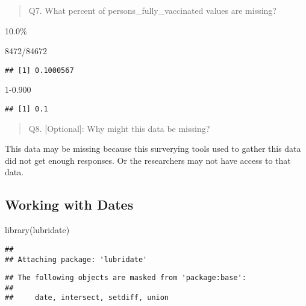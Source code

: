 \documentclass[
]{article}
\newenvironment{Shaded}{\begin{snugshade}}{\end{snugshade}}
\newcommand{\DecValTok}[1]{\textcolor[rgb]{0.00,0.00,0.81}{#1}}
\newcommand{\FloatTok}[1]{\textcolor[rgb]{0.00,0.00,0.81}{#1}}
\newcommand{\FunctionTok}[1]{\textcolor[rgb]{0.00,0.00,0.00}{#1}}
\newcommand{\NormalTok}[1]{#1}
\newcommand{\SpecialCharTok}[1]{\textcolor[rgb]{0.00,0.00,0.00}{#1}}
\begin{document}
\begin{quote}
Q7. What percent of persons\_fully\_vaccinated values are missing?
\end{quote}

10.0\%

\begin{Shaded}
\begin{Highlighting}[]
\DecValTok{8472}\SpecialCharTok{/}\DecValTok{84672} 
\end{Highlighting}
\end{Shaded}

\begin{verbatim}
## [1] 0.1000567
\end{verbatim}

\begin{Shaded}
\begin{Highlighting}[]
\DecValTok{1}\FloatTok{{-}0.900}
\end{Highlighting}
\end{Shaded}

\begin{verbatim}
## [1] 0.1
\end{verbatim}

\begin{quote}
Q8. {[}Optional{]}: Why might this data be missing?
\end{quote}

This data may be missing because this surverying tools used to gather
this data did not get enough responses. Or the researchers may not have
access to that data.

\hypertarget{working-with-dates}{%
\subsection{Working with Dates}\label{working-with-dates}}

\begin{Shaded}
\begin{Highlighting}[]
\FunctionTok{library}\NormalTok{(lubridate)}
\end{Highlighting}
\end{Shaded}

\begin{verbatim}
## 
## Attaching package: 'lubridate'
\end{verbatim}

\begin{verbatim}
## The following objects are masked from 'package:base':
## 
##     date, intersect, setdiff, union
\end{verbatim}
\end{document}
